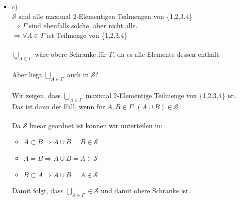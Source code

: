 \documentclass[a4paper]{scrartcl}
\begin{document}
\begin{itemize}
        \item c)\\
            $\mathcal{S}$ sind alle maximal 2-Elementigen Teilmengen von \{1,2,3,4\}\\
            $\Rightarrow \Gamma$ sind ebenfalls solche, aber nicht alle.\\
            $\Rightarrow \forall A \in \Gamma$ ist Teilmenge von \{1,2,3,4\}\\
            \\$\bigcup_{A \in \Gamma}$ wäre obere Schranke für $\Gamma$, da es alle Elemente dessen enthält.\\
            \\Aber liegt $\bigcup_{A \in \Gamma}$ auch in $\mathcal{S}$?\\
            \\Wir zeigen, dass $\bigcup_{A \in \Gamma}$ maximal 2-Elementige Teilmenge von \{1,2,3,4\} ist.\\
            Das ist dann der Fall, wenn für $A,B \in \Gamma: (A \cup B) \in \mathcal{S}$\\
            \\Da $\mathcal{S}$ linear geordnet ist können wir unterteilen in:\\
            \begin{itemize}
                \item $A \subset B \Rightarrow A \cup B = B \in \mathcal{S}$\\
                \item $A = B \Rightarrow A \cup B = A \in \mathcal{S}$\\
                \item $B \subset A \Rightarrow A \cup B = A \in \mathcal{S}$\\
            \end{itemize}
            Damit folgt, dass $\bigcup_{A \in \Gamma} \in \mathcal{S}$ und damit obere Schranke ist.\\
            





    \end{itemize}


\newpage

\section*{}%
\label{sec:aufgabe_3}
\end{document}
